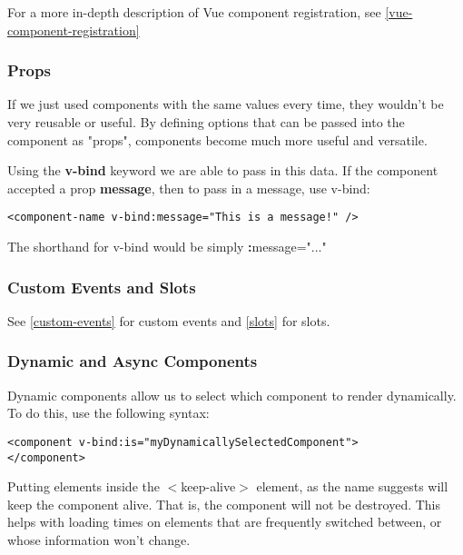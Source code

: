 \documentclass[portfolio.tex]{subfiles}
\begin{document}
					\noindent For a more in-depth description of Vue component registration, see \ref{vue-component-registration}

				\subsubsection{Props}
					If we just used components with the same values every time, they wouldn't be very reusable or useful. By defining options that can be passed into the component as "props", components become much more useful and versatile.

					 Using the \textbf{v-bind} keyword we are able to pass in this data. If the component accepted a prop \textbf{message}, then to pass in a message, use v-bind:\\

					\begin{lstlisting}
<component-name v-bind:message="This is a message!" />
					\end{lstlisting}

					The shorthand for v-bind would be simply \textbf{:}message="..."\\

				\subsubsection{Custom Events and Slots}
					See \ref{custom-events} for custom events and \ref{slots} for slots.

				\subsubsection{Dynamic and Async Components}
					Dynamic components allow us to select which component to render dynamically. To do this, use the following syntax:\\

					\begin{lstlisting}
<component v-bind:is="myDynamicallySelectedComponent">
</component>
					\end{lstlisting}

					\vspace{0.5cm}
					Putting elements inside the $<$keep-alive$>$ element, as the name suggests will keep the component alive. That is, the component will not be destroyed. This helps with loading times on elements that are frequently switched between, or whose information won't change. \\
\end{document}
